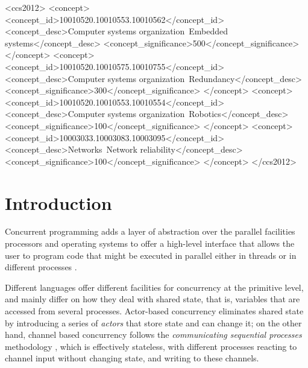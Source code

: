 \documentclass[sigconf]{acmart}
\begin{document}
%
%
\begin{CCSXML}
<ccs2012>
 <concept>
  <concept_id>10010520.10010553.10010562</concept_id>
  <concept_desc>Computer systems organization~Embedded systems</concept_desc>
  <concept_significance>500</concept_significance>
 </concept>
 <concept>
  <concept_id>10010520.10010575.10010755</concept_id>
  <concept_desc>Computer systems organization~Redundancy</concept_desc>
  <concept_significance>300</concept_significance>
 </concept>
 <concept>
  <concept_id>10010520.10010553.10010554</concept_id>
  <concept_desc>Computer systems organization~Robotics</concept_desc>
  <concept_significance>100</concept_significance>
 </concept>
 <concept>
  <concept_id>10003033.10003083.10003095</concept_id>
  <concept_desc>Networks~Network reliability</concept_desc>
  <concept_significance>100</concept_significance>
 </concept>
</ccs2012>  
\end{CCSXML}





\maketitle

\section{Introduction}

Concurrent programming adds a layer of abstraction over the parallel
facilities processors and operating systems to offer a
high-level interface that allows the user to program code that might
be executed in parallel either in threads or in different processes \cite{andrews1991concurrent}.

Different languages offer different facilities for concurrency at the
primitive level, and mainly differ on how they deal with shared state,
that is, variables that are accessed from several
processes. Actor-based concurrency \cite{schippers2009towards}
eliminates shared state by introducing a series of {\em actors} that
store state and can change it; on the other hand,  channel based
concurrency follows the {\em communicating sequential processes}
methodology \cite{Hoare:1978:CSP:359576.359585}, which is effectively
stateless, with different processes reacting to channel input without
changing state, and writing to these channels. 
\end{document}
